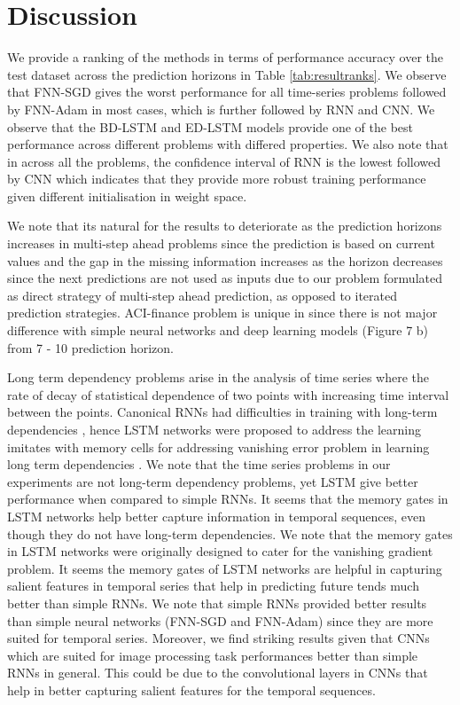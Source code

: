\documentclass[final,5p,times,twocolumn]{elsarticle}
\begin{document}
 
 \section{Discussion}
 
 
We provide a ranking of the methods in terms of performance accuracy over the test dataset across the prediction horizons in Table \ref{tab:resultranks}. We observe that FNN-SGD gives the worst performance for all time-series problems followed by FNN-Adam in most cases, which is further followed by RNN and CNN. We observe that the BD-LSTM and ED-LSTM models provide one of the best performance across different problems with differed properties. We also note that in across all the problems, the confidence interval of RNN is the lowest followed by CNN which indicates that they provide more robust training performance given different initialisation in weight space.
 
  We note that its natural for the results to deteriorate as the prediction horizons increases in multi-step ahead problems since the prediction is based on current values and the gap in the missing information increases as the horizon decreases since the next predictions are not used as inputs due to our problem formulated as direct strategy of multi-step ahead prediction, as opposed to iterated prediction strategies. ACI-finance problem is  unique in  since there is not major difference with simple neural networks and deep learning models (Figure 7 b) from 7 - 10 prediction horizon. 
  
 
 Long term dependency problems  arise in the analysis of   time series where  the rate of decay of statistical dependence of two points with increasing time interval between the points. Canonical RNNs had difficulties in training with long-term dependencies \cite{hochreiter1998vanishing}, hence LSTM networks were proposed to address the learning imitates with memory cells  for addressing vanishing error problem in learning long term dependencies \cite{hochreiter1997long}.
  We note that the time series  problems in our experiments  are not long-term dependency problems, yet LSTM give  better performance  when compared to  simple RNNs. It seems that  the memory gates in LSTM networks help better capture information in temporal sequences, even though they do not have  long-term dependencies. We note that the memory gates in LSTM networks were originally designed to cater for the vanishing gradient problem. It seems the memory gates of LSTM networks are helpful in capturing salient features in temporal series that help in predicting future tends much better than simple RNNs. We note that simple RNNs provided better results than simple neural networks (FNN-SGD and FNN-Adam) since they are more suited for temporal series. Moreover, we find striking results given that CNNs which are suited for image processing task performances better than simple RNNs in general. This could be due to the convolutional layers in CNNs that help in better capturing salient features for the temporal sequences. 
  
\end{document}
